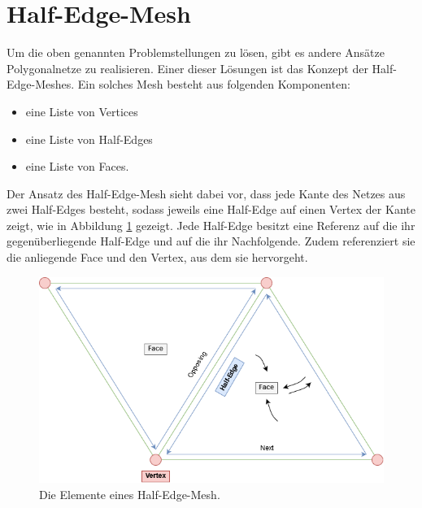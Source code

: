\section{Half-Edge-Mesh}
Um die oben genannten Problemstellungen zu l\"osen, gibt es andere Ans\"atze Polygonalnetze zu realisieren. Einer dieser L\"osungen ist das Konzept der Half-Edge-Meshes. Ein solches Mesh besteht aus folgenden Komponenten: 
\begin{itemize}
	\item eine Liste von Vertices
	\item eine Liste von Half-Edges
	\item eine Liste von Faces.
\end{itemize}
Der Ansatz des Half-Edge-Mesh sieht dabei vor, dass jede Kante des Netzes aus zwei Half-Edges besteht, sodass jeweils eine Half-Edge auf einen Vertex der Kante zeigt, wie in Abbildung \ref{fig:half-edge-mesh} gezeigt.
Jede Half-Edge besitzt eine Referenz auf die ihr gegen\"uberliegende Half-Edge und auf die ihr Nachfolgende. Zudem referenziert sie die anliegende Face und den Vertex, aus dem sie hervorgeht.
\begin{figure}[t]
	\centering
	\includegraphics[width=0.7\linewidth]{Images/half-edge-mesh}
	\caption[Half-Edge-Mesh Schematik]{Die Elemente eines Half-Edge-Mesh.}
	\label{fig:half-edge-mesh}
\end{figure}


